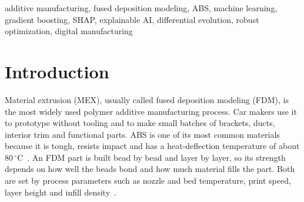 \documentclass[conference,12pt]{IEEEtran}
\newcommand{\degC}{\ensuremath{^{\circ}}C}
\begin{document}
\begin{abstract}
\normalsize %
Fused deposition modeling (FDM) of ABS is now used for functional automotive parts, and the strength of a printed part depends heavily on the process parameters. Using the 383-record dataset of Munshi \textit{et al.}, we predict the tensile and compressive strength of FDM-printed ABS from nozzle temperature, bed temperature, print speed, layer height and infill density, explain each prediction, and compute optimal printing recipes. We evaluated nine regressors, including replications of the published Adam-optimized and Bayesian-regularized ANNs, with nine metrics under hold-out and 5-fold cross-validation. Histogram-based gradient boosting did best, with a cross-validated $R^2$ of 0.9995 and RMSEs of 0.25~MPa (tensile) and 0.31~MPa (compressive). Exact SHAP values in MPa attribute 62\%, 23\% and 11\% of the explained variation to infill density, layer height and print speed, and show no measurable effect of bed temperature. A robust differential-evolution optimizer scores each recipe by its worst-case strength under $\pm 5$-unit process drift, and we checked it against an exhaustive search over all 960 tested combinations. The strongest window it finds (0.2~mm layers, $\geq 95$\% infill, $\leq 35$~mm/s) gives 50.4/63.0~MPa. For a brake pedal ($\sigma_c \geq 45$~MPa) and a door handle ($\sigma_t \geq 30$~MPa), it finds recipes that print 75\% and 87.5\% faster. We also built a browser-based simulator around the model, and it matches the Python model to within $10^{-10}$~MPa.
\end{abstract}

\begin{IEEEkeywords}
\normalsize
additive manufacturing, fused deposition modeling, ABS, machine learning, gradient boosting, SHAP, explainable AI, differential evolution, robust optimization, digital manufacturing
\end{IEEEkeywords}

\section{Introduction}
Material extrusion (MEX), usually called fused deposition modeling (FDM), is the most widely used polymer additive manufacturing process. Car makers use it to prototype without tooling and to make small batches of brackets, ducts, interior trim and functional parts. ABS is one of its most common materials because it is tough, resists impact and has a heat-deflection temperature of about 80\,\degC~\cite{munshi2026}. An FDM part is built bead by bead and layer by layer, so its strength depends on how well the beads bond and how much material fills the part. Both are set by process parameters such as nozzle and bed temperature, print speed, layer height and infill density~\cite{sood2010,mohamed2015}.
\end{document}
